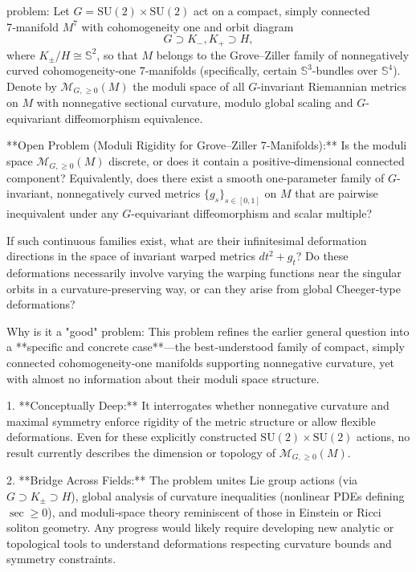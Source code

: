 problem:  
Let \(G = \mathrm{SU}(2) \times \mathrm{SU}(2)\) act on a compact, simply connected 7‑manifold \(M^7\) with cohomogeneity one and orbit diagram
\[
G \supset K_-, K_+ \supset H,
\]
where \(K_\pm/H \cong \mathbb{S}^2\), so that \(M\) belongs to the Grove–Ziller family of nonnegatively curved cohomogeneity‑one 7‑manifolds (specifically, certain \(\mathbb{S}^3\)-bundles over \(\mathbb{S}^4\)).  
Denote by \(\mathcal{M}_{G,\ge 0}(M)\) the moduli space of all \(G\)-invariant Riemannian metrics on \(M\) with nonnegative sectional curvature, modulo global scaling and \(G\)-equivariant diffeomorphism equivalence.

**Open Problem (Moduli Rigidity for Grove–Ziller 7‑Manifolds):**  
Is the moduli space \(\mathcal{M}_{G,\ge 0}(M)\) discrete, or does it contain a positive‑dimensional connected component?  
Equivalently, does there exist a smooth one‑parameter family of \(G\)-invariant, nonnegatively curved metrics \(\{g_s\}_{s\in[0,1]}\) on \(M\) that are pairwise inequivalent under any \(G\)-equivariant diffeomorphism and scalar multiple?

If such continuous families exist, what are their infinitesimal deformation directions in the space of invariant warped metrics \(dt^2 + g_t\)?  Do these deformations necessarily involve varying the warping functions near the singular orbits in a curvature‑preserving way, or can they arise from global Cheeger‑type deformations?

Why is it a "good" problem:  
This problem refines the earlier general question into a **specific and concrete case**—the best‑understood family of compact, simply connected cohomogeneity‑one manifolds supporting nonnegative curvature, yet with almost no information about their moduli space structure.  

1. **Conceptually Deep:**  
   It interrogates whether nonnegative curvature and maximal symmetry enforce rigidity of the metric structure or allow flexible deformations.  Even for these explicitly constructed \(\mathrm{SU}(2)\times\mathrm{SU}(2)\) actions, no result currently describes the dimension or topology of \(\mathcal{M}_{G,\ge 0}(M)\).  

2. **Bridge Across Fields:**  
   The problem unites Lie group actions (via \(G\supset K_\pm \supset H\)), global analysis of curvature inequalities (nonlinear PDEs defining \(\sec\ge 0\)), and moduli‑space theory reminiscent of those in Einstein or Ricci soliton geometry.  Any progress would likely require developing new analytic or topological tools to understand deformations respecting curvature bounds and symmetry constraints.  


